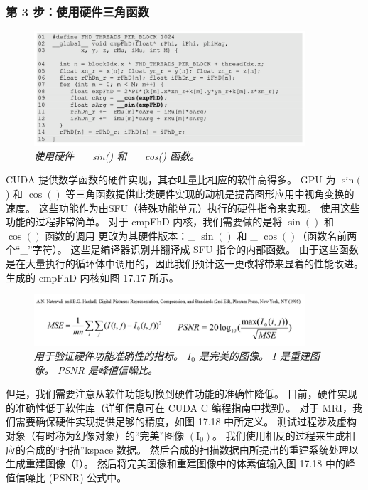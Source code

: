 \subsubsection{第 3 步：使用硬件三角函数}
\begin{figure}[H]
	\centering
	\includegraphics[width=0.9\textwidth]{figs/F17.17.png}
	\caption{\textit{使用硬件 \_\_sin() 和 \_\_cos() 函数。}}
\end{figure}

CUDA 提供数学函数的硬件实现，其吞吐量比相应的软件高得多。 
GPU 为 $\sin ($ ) 和 $\cos ()$ 等三角函数提供此类硬件实现的动机是提高图形应用中视角变换的速度。 
这些功能作为由SFU（特殊功能单元）执行的硬件指令来实现。 使用这些功能的过程非常简单。 
对于 cmpFhD 内核，我们需要做的是将 $\sin ()$ 和 $\cos ()$ 函数的调用
更改为其硬件版本：\_ $\sin ()$ 和 \_ $ \cos ()$（函数名前两个“\_”字符）。 
这些是编译器识别并翻译成 SFU 指令的内部函数。 
由于这些函数是在大量执行的循环体中调用的，因此我们预计这一更改将带来显着的性能改进。 生成的 cmpFhD 内核如图 17.17 所示。

\begin{figure}[H]
	\centering
	\includegraphics[width=0.9\textwidth]{figs/F17.18.png}
	\caption{\textit{用于验证硬件功能准确性的指标。 $I_0$ 是完美的图像。 $I$ 是重建图像。 PSNR 是峰值信噪比。}}
\end{figure}

但是，我们需要注意从软件功能切换到硬件功能的准确性降低。 
目前，硬件实现的准确性低于软件库（详细信息可在 CUDA C 编程指南中找到）。 
对于 MRI，我们需要确保硬件实现提供足够的精度，如图 17.18 中所定义。 
测试过程涉及虚构对象（有时称为幻像对象）的“完美”图像 $\left(\mathrm{I}_{0}\right)$。 
我们使用相反的过程来生成相应的合成的“扫描”kspace 数据。 然后合成的扫描数据由所提出的重建系统处理以生成重建图像（I）。 
然后将完美图像和重建图像中的体素值输入图 17.18 中的峰值信噪比 (PSNR) 公式中。

